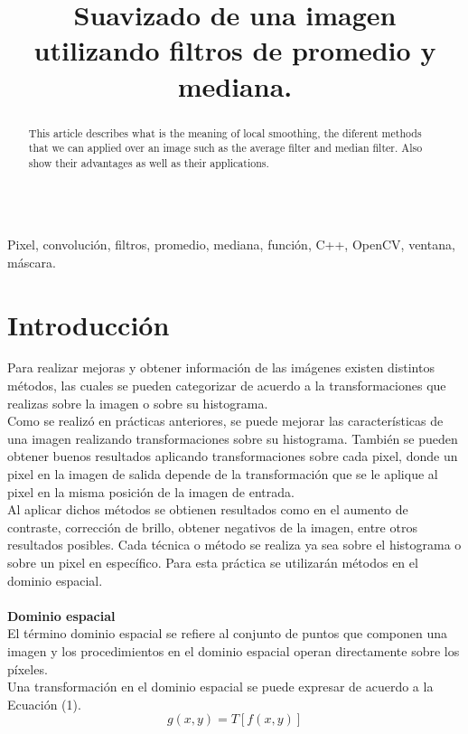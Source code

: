 \documentclass[conference]{IEEEtran}
\begin{document}
\title{ Suavizado de una imagen utilizando filtros de promedio y mediana. }
\author{
}

\maketitle
\renewcommand\abstractname{Abstract}
\begin{abstract}
This article describes what is the meaning of local smoothing, the diferent methods that we can applied over an image such as the average filter and median filter. Also show their advantages as well as their applications. \\\\
\end{abstract}

\begin{IEEEkeywords}
Pixel, convoluci\'on, filtros, promedio, mediana, funci\'on, C++, OpenCV, ventana, m\'ascara.
\end{IEEEkeywords}

\IEEEpeerreviewmaketitle
\section{Introducci\'on} 
Para realizar mejoras y obtener informaci\'on de las im\'agenes existen distintos m\'etodos, las cuales se pueden categorizar de acuerdo a la transformaciones que realizas sobre la imagen o sobre su histograma.\\ Como se realiz\'o en pr\'acticas anteriores, se puede mejorar las caracter\'isticas de una imagen realizando transformaciones sobre su histograma. Tambi\'en se pueden obtener buenos resultados aplicando transformaciones sobre cada pixel, donde un pixel en la imagen de salida depende de la transformaci\'on que se le aplique al pixel en la misma posici\'on de la imagen de entrada.\\
Al aplicar dichos m\'etodos se obtienen resultados como en el aumento de contraste, correcci\'on de brillo, obtener negativos de la imagen, entre otros resultados posibles. Cada t\'ecnica o m\'etodo se realiza ya sea sobre el histograma o sobre un pixel en espec\'ifico. Para esta pr\'actica  se utilizar\'an m\'etodos en el dominio espacial.\\\\
\textbf{Dominio espacial\\}
El t\'ermino dominio espacial se refiere al conjunto de puntos que componen una imagen y los procedimientos en el dominio espacial operan directamente sobre los p\'ixeles. \\
Una transformaci\'on en el dominio espacial se puede expresar de acuerdo a la Ecuaci\'on (1).\\
\begin{equation}
	g(x,y) = T[f(x,y)]
\end{equation}
\end{document}
